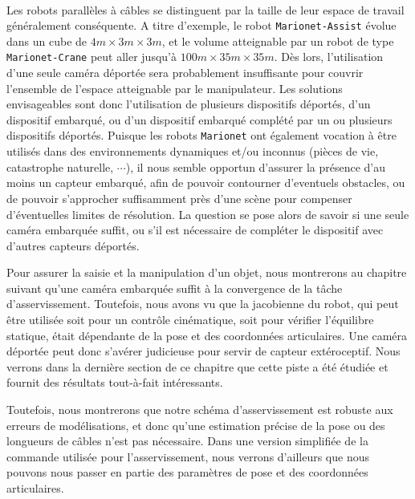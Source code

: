 \\

Les robots parall\`eles \`a c\^ables se distinguent par la taille de leur 
espace de travail g\'en\'eralement cons\'equente. A titre d'exemple, le robot 
{\tt Marionet-As\-sist} évolue dans un cube de $4m \times 3m \times 3m$, et le 
volume atteignable par un robot de type {\tt Marionet-Crane} peut aller jusqu'à 
$100m \times 35m \times 35m$. D\`es lors, l'utilisation d'une seule cam\'era 
d\'eport\'ee sera probablement insuffisante pour couvrir l'ensemble de l'espace 
atteignable par le manipulateur. Les solutions envisageables sont donc 
l'utilisation de plusieurs dispositifs d\'eport\'es, d'un dispositif 
embarqu\'e, ou d'un dispositif embarqu\'e compl\'et\'e par un ou plusieurs 
dispositifs d\'eport\'es. Puisque les robots {\tt Marionet} ont \'egalement 
vocation \`a \^etre utilis\'es dans des environnements dynamiques et/ou inconnus 
(pi\`eces de vie, catastrophe naturelle, $\cdots$), il nous semble opportun 
d'assurer la pr\'esence d'au moins un capteur embarqu\'e, afin de pouvoir 
contourner d'eventuels obstacles, ou de pouvoir s'approcher suffisamment pr\`es 
d'une sc\`ene pour compenser d'\'eventuelles limites de r\'esolution. La 
question se pose alors de savoir si une seule cam\'era embarqu\'ee suffit, ou 
s'il est n\'ecessaire de compl\'eter le dispositif avec d'autres capteurs 
d\'eport\'es.

Pour assurer la saisie et la manipulation d'un objet, nous montrerons au 
chapitre suivant qu'une cam\'era embarqu\'ee suffit \`a la convergence de la 
t\^ache d'asservissement. Toutefois, nous avons vu que la jacobienne du robot, 
qui peut \^etre utilis\'ee soit pour un contr\^ole cin\'ematique, soit pour 
v\'erifier l'\'equilibre statique, \'etait d\'ependante de la pose et des 
coordonn\'ees articulaires. Une cam\'era d\'eport\'ee peut donc s'av\'erer 
judicieuse pour servir de capteur ext\'eroceptif. Nous verrons dans la 
derni\`ere section de ce chapitre que cette piste a \'et\'e \'etudi\'ee et 
fournit des r\'esultats tout-\`a-fait int\'eressants.

Toutefois, nous montrerons que notre sch\'ema d'asservissement est robuste aux 
erreurs de mod\'elisations, et donc qu'une estimation pr\'ecise de la pose ou 
des longueurs de c\^ables n'est pas n\'ecessaire. Dans une version simplifi\'ee 
de la commande utilis\'ee pour l'asservissement, nous verrons d'ailleurs que 
nous pouvons nous passer en partie des param\`etres de pose et des 
coordonn\'ees articulaires.

